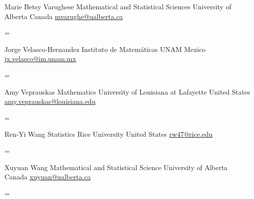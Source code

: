 \documentclass[
  letterpaper,
  DIV=11,
  numbers=noendperiod]{scrartcl}
\newenvironment{absolutelynopagebreak}
  {\par\nobreak\vfil\penalty0\vfilneg
   \vtop\bgroup}
  {\par\xdef\tpd{\the\prevdepth}\egroup
   \prevdepth=\tpd}
\begin{document}
\begin{absolutelynopagebreak}Marie Betsy   Varughese \newline
\mbox{}\quad  Mathematical and Statistical Sciences \newline
\mbox{}\quad  University of Alberta \newline
\mbox{}\quad  Canada \newline
\mbox{}\quad \href{mailto: mvarughe@ualberta.ca }{ mvarughe@ualberta.ca }
\end{absolutelynopagebreak}\vskip0.2cm
\begin{absolutelynopagebreak}Jorge   Velasco-Hernandez \newline
\mbox{}\quad  Instituto de Matemáticas \newline
\mbox{}\quad  UNAM \newline
\mbox{}\quad  Mexico \newline
\mbox{}\quad \href{mailto: jx.velasco@im.unam.mx }{ jx.velasco@im.unam.mx }
\end{absolutelynopagebreak}\vskip0.2cm
\begin{absolutelynopagebreak}Amy   Veprauskas \newline
\mbox{}\quad  Mathematics \newline
\mbox{}\quad  University of Louisiana at Lafayette \newline
\mbox{}\quad  United States \newline
\mbox{}\quad \href{mailto: amy.veprauskas@louisiana.edu }{ amy.veprauskas@louisiana.edu }
\end{absolutelynopagebreak}\vskip0.2cm
\begin{absolutelynopagebreak}Ren-Yi   Wang \newline
\mbox{}\quad  Statistics \newline
\mbox{}\quad  Rice University \newline
\mbox{}\quad  United States \newline
\mbox{}\quad \href{mailto: rw47@rice.edu }{ rw47@rice.edu }
\end{absolutelynopagebreak}\vskip0.2cm
\begin{absolutelynopagebreak}Xuyuan   Wang \newline
\mbox{}\quad  Mathematical and Statistical Science \newline
\mbox{}\quad  University of Alberta \newline
\mbox{}\quad  Canada \newline
\mbox{}\quad \href{mailto: xuyuan@ualberta.ca }{ xuyuan@ualberta.ca }
\end{absolutelynopagebreak}\vskip0.2cm
\end{document}
